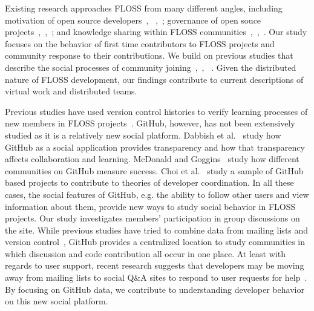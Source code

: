 \documentclass{sigchi}
\begin{document}
Existing research approaches FLOSS from many different angles, including
motivation of open source
developers~\cite{fang_understanding_2009},
~\cite{lakhani_why_2003},~\cite{shah_motivation_2006}; governance of open souce
projects~\cite{hippel_open_2003},~\cite{omahony_guarding_2003},~\cite{omahony_governance_2007};
and knowledge sharing within FLOSS
communities~\cite{endres_tacit_2007},~\cite{hemetsberger_collective_2009},~\cite{sowe_understanding_2008}.
Our study focuses on the behavior of first time contributors to FLOSS projects
and community response to their contributions. We build on previous studies that
describe the social processes of community
joining~\cite{ducheneaut_socialization_2005},~\cite{huang_mining_2005}, ~\cite{von_krogh_community_2003}. Given the
distributed nature of FLOSS development, our findings contribute to current
descriptions of virtual work and distributed teams.

Previous studies have used version control histories to verify learning
processes of new members in FLOSS projects~\cite{huang_mining_2005}. GitHub,
however, has not been extensively studied as it is a relatively new social
platform. Dabbish et al.~\cite{dabbish_social_2012} study how GitHub as a social
application provides transparency and how that transparency affects
collaboration and learning. McDonald and
Goggins~\cite{mcdonald_performance_2013} study how different communities on
GitHub measure success. Choi et al.~\cite{choi_herding_2013} study a sample of
GitHub based projects to contribute to theories of developer coordination. In
all these cases, the social features of GitHub, e.g. the ability to follow other
users and view information about them, provide new ways to study social behavior
in FLOSS projects. Our study investigates members' participation in group
discussions on the site. While previous studies have tried to combine data from
mailing lists and version control~\cite{ducheneaut_socialization_2005}, GitHub
provides a centralized location to study communities in which discussion and
code contribution all occur in one place. At least with regards to user support,
recent research suggests that developers may be moving away from mailing lists
to social Q\&A sites to respond to user requests for
help~\cite{vasilescu_how_2014}. By focusing on GitHub data, we contribute to
understanding developer behavior on this new social platform.
\end{document}

